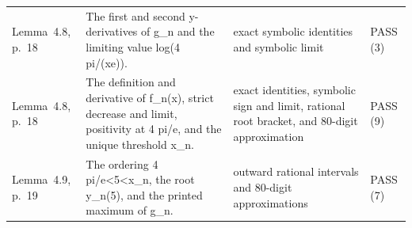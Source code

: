 {\begin{longtable}{@{}>{\raggedright\arraybackslash}p{30mm}>{\raggedright\arraybackslash}p{64mm}>{\raggedright\arraybackslash}p{44mm}>{\raggedright\arraybackslash}p{16mm}@{}}
Lemma~4.8, p.~18 & The first and second y-derivatives of g\_n and the limiting value log(4 pi/(xe)). & exact symbolic identities and symbolic limit & PASS (3) \\
Lemma~4.8, p.~18 & The definition and derivative of f\_n(x), strict decrease and limit, positivity at 4 pi/e, and the unique threshold x\_n. & exact identities, symbolic sign and limit, rational root bracket, and 80-digit approximation & PASS (9) \\
Lemma~4.9, p.~19 & The ordering 4 pi/e<5<x\_n, the root y\_n(5), and the printed maximum of g\_n. & outward rational intervals and 80-digit approximations & PASS (7) \\
\end{longtable}
}
